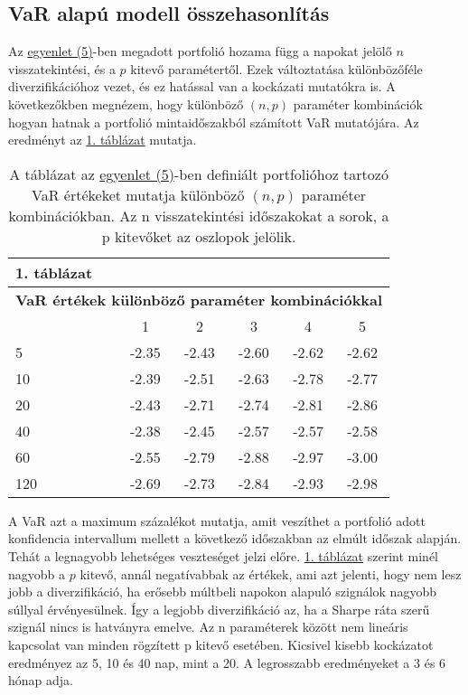 \documentclass[a4paper,12pt]{article}
\begin{document}
\subsection{VaR alapú modell összehasonlítás}
Az \hyperref[eq:eq1]{egyenlet (5)}-ben megadott portfolió hozama függ a napokat jelölő $n$ visszatekintési, és a $p$ kitevő paramétertől. 
Ezek változtatása különbözőféle diverzifikációhoz vezet, és ez hatással van a kockázati mutatókra is. 
A következőkben megnézem, hogy különböző $(n,p)$ paraméter kombinációk hogyan hatnak a portfolió mintaidőszakból számított VaR mutatójára. 
Az eredményt az \hyperref[table:table1]{1. táblázat} mutatja. 
\begin{table}[!ht]
\tiny
    \centering
    \begin{tabular}{lccccc}
\textbf{1. táblázat} &&&& &  \\
\toprule
  \multicolumn{6}{c}{\textbf{VaR értékek különböző paraméter kombinációkkal}} \\  
\midrule
	 & 1 & 2 & 3 & 4 & 5 \\ 
\cmidrule{2-6}
        5 & -2.35 & -2.43 & -2.60 & -2.62 & -2.62 \\ 
        10 & -2.39 & -2.51 & -2.63 & -2.78 & -2.77 \\ 
        20 & -2.43 & -2.71 & -2.74 & -2.81 & -2.86 \\ 
        40 & -2.38 & -2.45 & -2.57 & -2.57 & -2.58 \\ 
        60 & -2.55 & -2.79 & -2.88 & -2.97 & -3.00 \\ 
        120 & -2.69 & -2.73 & -2.84 & -2.93 & -2.98 \\ 
\bottomrule
\end{tabular}
\caption*{\tiny 
A táblázat az \hyperref[eq:eq1]{egyenlet (5)}-ben definiált portfolióhoz tartozó VaR értékeket mutatja különböző $(n,p)$ paraméter kombinációkban. 
Az n visszatekintési időszakokat a sorok, a p kitevőket az oszlopok jelölik. 
}
\label{table:table1}
\end{table}
A VaR azt a maximum százalékot mutatja, amit veszíthet a portfolió adott konfidencia intervallum mellett a következő időszakban az elmúlt időszak alapján. 
Tehát a legnagyobb lehetséges veszteséget jelzi előre. 
\hyperref[table:table1]{1. táblázat} szerint minél nagyobb a $p$ kitevő, annál negatívabbak az értékek, ami azt jelenti, hogy nem lesz jobb a diverzifikáció, ha erősebb múltbeli napokon alapuló szignálok nagyobb súllyal érvényesülnek. 
Így a legjobb diverzifikáció az, ha a Sharpe ráta szerű szignál nincs is hatványra emelve. 
Az n paraméterek között nem lineáris kapcsolat van minden rögzített p kitevő esetében. 
Kicsivel kisebb kockázatot eredményez az 5, 10 és 40 nap, mint a 20. A legrosszabb eredményeket a 3 és 6 hónap adja. 
\end{document}
